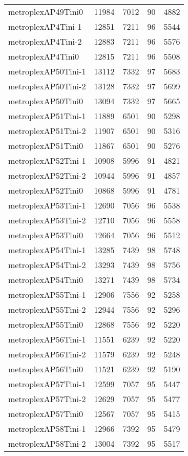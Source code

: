 \begin{longtable}{lrrrr}
metroplexAP49Tini0 & 11984 & 7012 & 90 & 4882 \\
metroplexAP4Tini-1 & 12851 & 7211 & 96 & 5544 \\
metroplexAP4Tini-2 & 12883 & 7211 & 96 & 5576 \\
metroplexAP4Tini0 & 12815 & 7211 & 96 & 5508 \\
metroplexAP50Tini-1 & 13112 & 7332 & 97 & 5683 \\
metroplexAP50Tini-2 & 13128 & 7332 & 97 & 5699 \\
metroplexAP50Tini0 & 13094 & 7332 & 97 & 5665 \\
metroplexAP51Tini-1 & 11889 & 6501 & 90 & 5298 \\
metroplexAP51Tini-2 & 11907 & 6501 & 90 & 5316 \\
metroplexAP51Tini0 & 11867 & 6501 & 90 & 5276 \\
metroplexAP52Tini-1 & 10908 & 5996 & 91 & 4821 \\
metroplexAP52Tini-2 & 10944 & 5996 & 91 & 4857 \\
metroplexAP52Tini0 & 10868 & 5996 & 91 & 4781 \\
metroplexAP53Tini-1 & 12690 & 7056 & 96 & 5538 \\
metroplexAP53Tini-2 & 12710 & 7056 & 96 & 5558 \\
metroplexAP53Tini0 & 12664 & 7056 & 96 & 5512 \\
metroplexAP54Tini-1 & 13285 & 7439 & 98 & 5748 \\
metroplexAP54Tini-2 & 13293 & 7439 & 98 & 5756 \\
metroplexAP54Tini0 & 13271 & 7439 & 98 & 5734 \\
metroplexAP55Tini-1 & 12906 & 7556 & 92 & 5258 \\
metroplexAP55Tini-2 & 12944 & 7556 & 92 & 5296 \\
metroplexAP55Tini0 & 12868 & 7556 & 92 & 5220 \\
metroplexAP56Tini-1 & 11551 & 6239 & 92 & 5220 \\
metroplexAP56Tini-2 & 11579 & 6239 & 92 & 5248 \\
metroplexAP56Tini0 & 11521 & 6239 & 92 & 5190 \\
metroplexAP57Tini-1 & 12599 & 7057 & 95 & 5447 \\
metroplexAP57Tini-2 & 12629 & 7057 & 95 & 5477 \\
metroplexAP57Tini0 & 12567 & 7057 & 95 & 5415 \\
metroplexAP58Tini-1 & 12966 & 7392 & 95 & 5479 \\
metroplexAP58Tini-2 & 13004 & 7392 & 95 & 5517 \\

\end{longtable}
